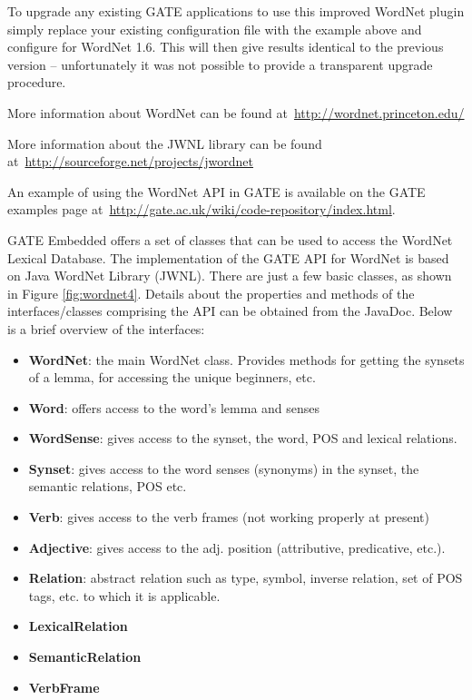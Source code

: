 To upgrade any existing GATE applications to use this improved WordNet plugin simply replace your
existing configuration file with the example above and configure for WordNet 1.6. This will then
give results identical to the previous version -- unfortunately it was not possible to provide
a transparent upgrade procedure.

More information about WordNet can be found
at~\url{http://wordnet.princeton.edu/}

More information about the JWNL library can be found
at~\url{http://sourceforge.net/projects/jwordnet}

An example of using the WordNet API in GATE is available on the GATE examples
page at~\url{http://gate.ac.uk/wiki/code-repository/index.html}.


GATE Embedded offers a set of classes that can be used to access the
WordNet Lexical Database. The implementation of the GATE API
for WordNet is based on Java WordNet Library (JWNL). There are just a
few basic classes, as shown in Figure
\ref{fig:wordnet4}. Details about the properties and methods of the
interfaces/classes comprising the API can be obtained from the
JavaDoc. Below is a brief overview of the interfaces:
\begin{itemize}
\item \textbf{WordNet}: the main WordNet class. Provides methods for getting the
synsets of a lemma, for accessing the unique beginners, etc.

\item \textbf{Word}: offers access to the word's lemma and senses

\item \textbf{WordSense}: gives access to the synset, the word, POS
and lexical relations.

\item \textbf{Synset}: gives access to the word senses (synonyms) in
the synset, the semantic relations, POS etc.

\item \textbf{Verb}: gives access to the verb frames (not working
properly at present)

\item \textbf{Adjective}: gives access to the adj. position
(attributive, predicative, etc.).

\item \textbf{Relation}: abstract relation such as type, symbol,
inverse relation, set of POS tags, etc. to which it is applicable.

\item \textbf{LexicalRelation}

\item \textbf{SemanticRelation}

\item \textbf{VerbFrame}
\end{itemize}

